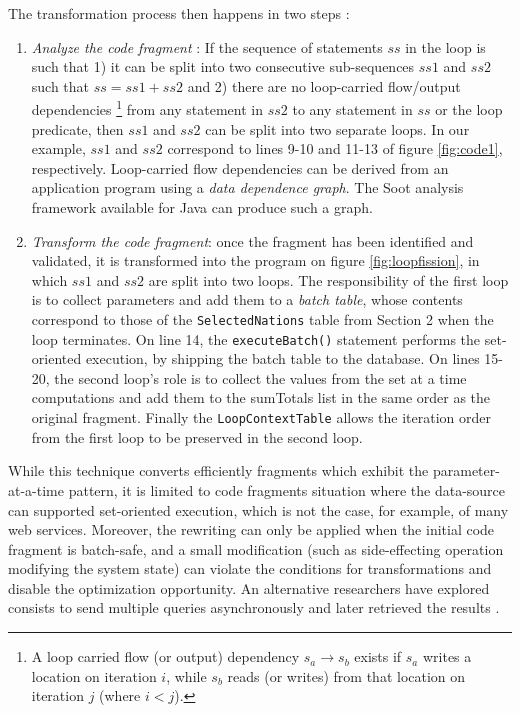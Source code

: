 The transformation process then happens in two steps :
\begin{enumerate}
\item{\emph{Analyze the code fragment} : If the sequence of statements $ss$ in the loop is such that 1) it can be split into two consecutive sub-sequences $ss1$ and $ss2$ such that $ss = ss1 + ss2$ and 2) there are no loop-carried flow/output dependencies \footnote{A loop carried flow (or output) dependency $s_a \rightarrow s_b$ exists if $s_a$ writes a location on iteration $i$, while $s_b$ reads (or writes) from that location on iteration $j$ (where $i < j$).} from any statement in $ss2$ to any statement in $ss$ or the loop predicate, then $ss1$ and $ss2$ can be split into two separate loops. In our example, $ss1$ and $ss2$ correspond to lines 9-10 and 11-13 of figure \ref{fig:code1}, respectively. Loop-carried flow dependencies can be derived from an application program using a \emph{data dependence graph}. The Soot analysis framework \cite{soot} available for Java can produce such a graph.}
\item{\emph{Transform the code fragment}: once the fragment has been identified and validated, it is transformed into the program on figure \ref{fig:loopfission}, in which $ss1$ and $ss2$ are split into two loops.  The responsibility of the first loop is to collect parameters and add them to a \emph{batch table}, whose contents correspond to those of the \texttt{SelectedNations} table from Section 2 when the loop terminates. On line 14, the \texttt{executeBatch()} statement performs the set-oriented execution, by shipping the batch table to the database. On lines 15-20, the second loop's role is to collect the values from the set at a time computations and add them to the sumTotals list in the same order as the original fragment. Finally the \texttt{LoopContextTable} allows the iteration order from the first loop to be preserved in the second loop.}
\end{enumerate}

While this technique converts efficiently fragments which exhibit the parameter-at-a-time pattern, it is limited to code fragments situation where the data-source can supported set-oriented execution, which is not the case, for example, of many web services.
Moreover, the rewriting can only be applied when the initial code fragment is batch-safe, and a small modification (such as side-effecting operation modifying the system state) can violate the conditions for transformations and disable the optimization opportunity. An alternative researchers have explored consists to send multiple queries asynchronously and later retrieved the results \cite{ramachandra:2012aa, manjhi:2009aa}. 


